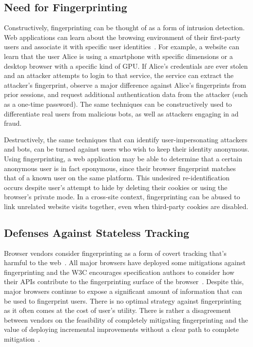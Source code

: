\vspace{-1mm}
\subsection{Need for Fingerprinting}
\label{sec:need-for-fingerprinting}
\vspace{-2mm}

Constructively, fingerprinting can be thought of as a form of intrusion detection. 
%
Web applications can learn about the browsing environment of their first-party users and associate it with specific user identities~\cite{LinPhishSheepsClothing2022}. 
%
For example, a website can learn that the user Alice is using a smartphone with specific dimensions or a desktop browser with a specific kind of GPU. 
%
If Alice's credentials are ever stolen and an attacker attempts to login to that service, the service can extract the attacker's fingerprint, observe a major difference against Alice's fingerprints from prior sessions, and request additional authentication data from the attacker (such as a one-time password).
%
The same techniques can be constructively used to differentiate real users from malicious bots, as well as attackers engaging in ad fraud.


Destructively, the same techniques that can identify user-impersonating attackers and bots, can be turned against users who wish to keep their identity anonymous. 
%
Using fingerprinting, a web application may be able to determine that a certain anonymous user is in fact eponymous, since their browser fingerprint matches that of a known user on the same platform. 
%
This undesired re-identification occurs despite user's attempt to hide by deleting their cookies or using the browser's private mode. 
%
In a cross-site context, fingerprinting can be abused to link unrelated website visits together, even when third-party cookies are disabled.


\vspace{-1mm}
\subsection{Defenses Against Stateless Tracking}
\label{sec:stateless-defenses}
\vspace{-2mm}

Browser vendors consider fingerprinting as a form of covert tracking that’s harmful to the web~\cite{nottinghamUnsanctionedWebTracking2015}. 
%
All major browsers have deployed some mitigations against fingerprinting and the W3C encourages specification authors to consider how their APIs contribute to the fingerprinting surface of the browser~\cite{dotyMitigatingBrowserFingerprinting2019}. 
%
Despite this, major browsers continue to expose a significant amount of information that can be used to fingerprint users.
%
There is no optimal strategy against fingerprinting as it often comes at the cost of user's utility. 
%
There is rather a disagreement between vendors on the feasibility of completely mitigating fingerprinting and the value of deploying incremental improvements without a clear path to complete mitigation~\cite{snyderBraveFingerprintingPrivacy2019, rescorlaTechnicalCommentsPrivacy2021}. 
%


